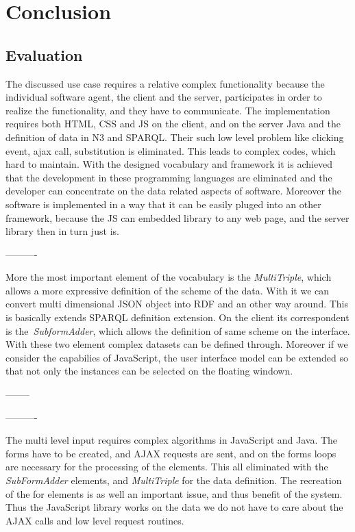 

\chapter{Conclusion}

\section{Evaluation}




The discussed use case requires a relative complex functionality because the individual software agent, the client and the server, participates in order to realize the functionality, and they have to communicate. The implementation requires both HTML, CSS and JS on the client, and on the server Java and the definition of data in N3 and SPARQL. Their such low level problem like clicking event, ajax call, substitution is eliminated.
This leads to complex codes, which hard to maintain. With the designed vocabulary and framework it is achieved that the development in these programming languages are eliminated and the developer can concentrate on the data related aspects of software. Moreover the software is implemented in a way that it can be easily pluged into an other framework, because the JS can embedded library to any web page, and the server library then in turn just is.


----------

More the most important element of the vocabulary is the \textit{MultiTriple}, which allows a more expressive definition of the scheme of the data. With it we can convert multi dimensional JSON object into RDF and an other way around. This is basically extends SPARQL definition extension. On the client its correspondent is the \textit{SubformAdder}, which allows the definition of same scheme on the interface. With these two element complex datasets can be defined through. Moreover if we consider the capabilies of JavaScript, the user interface model can be extended so that not only the instances can be selected on the floating windown. 
 


--------

 

 


----------

The multi level input requires complex algorithms in JavaScript and Java. The forms have to be created, and AJAX requests are sent, and on the forms loops are necessary for the processing of the elements. This all eliminated with the \textit{SubFormAdder} elements, and \textit{MultiTriple} for the data definition. The recreation of the for elements is as well an important issue, and thus benefit of the system. Thus the JavaScript library works on the data we do not have to care about the AJAX calls and low level request routines. 


